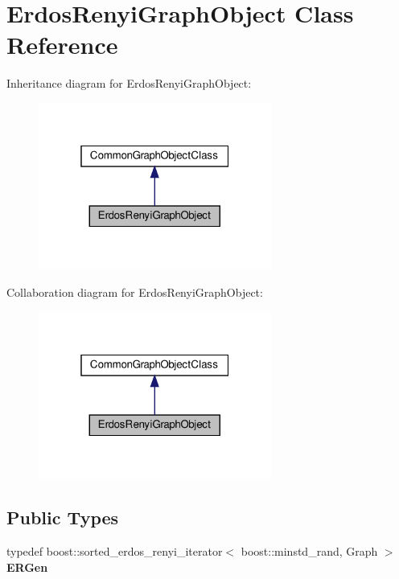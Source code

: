 \hypertarget{classErdosRenyiGraphObject}{}\section{Erdos\+Renyi\+Graph\+Object Class Reference}
\label{classErdosRenyiGraphObject}


Inheritance diagram for Erdos\+Renyi\+Graph\+Object\+:
\nopagebreak
\begin{figure}[H]
\begin{center}
\leavevmode
\includegraphics[width=217pt]{classErdosRenyiGraphObject__inherit__graph}
\end{center}
\end{figure}


Collaboration diagram for Erdos\+Renyi\+Graph\+Object\+:
\nopagebreak
\begin{figure}[H]
\begin{center}
\leavevmode
\includegraphics[width=217pt]{classErdosRenyiGraphObject__coll__graph}
\end{center}
\end{figure}
\subsection*{Public Types}
\begin{DoxyCompactItemize}
\item 
\mbox{\label{classErdosRenyiGraphObject_a604e71001c96c8b45111302fc00a977a}} 
typedef boost\+::sorted\+\_\+erdos\+\_\+renyi\+\_\+iterator$<$ boost\+::minstd\+\_\+rand, Graph $>$ {\bfseries E\+R\+Gen}
\end{DoxyCompactItemize}
